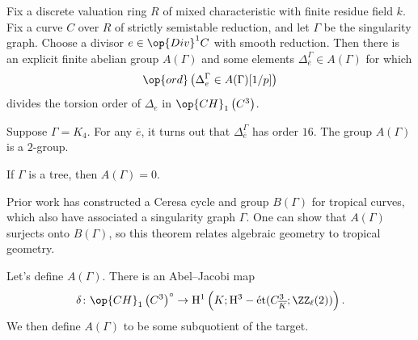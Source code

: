 \documentclass{article}
\begin{document}
\begin{theorem}
	Fix a discrete valuation ring $R$ of mixed characteristic with finite residue field $k$. Fix a curve $C$ over $R$ of strictly semistable reduction, and let $\Gamma$ be the singularity graph. Choose a divisor $e\in\op{Div}^1C$ with smooth reduction. Then there is an explicit finite abelian group $A(\Gamma)$ and some elements $\Delta_{\overline e}^\Gamma\in A(\Gamma)$ for which
	\[\op{ord}\left(\Delta_e^\Gamma\in A(\Gamma)[1/p]\right)\]
	divides the torsion order of $\Delta_e$ in $\op{CH}_1\left(C^3\right)$.
\end{theorem}
\begin{example}
	Suppose $\Gamma=K_4$. For any $\overline e$, it turns out that $\Delta_{\overline e}^\Gamma$ has order $16$. The group $A(\Gamma)$ is a $2$-group.
\end{example}
\begin{example}
	If $\Gamma$ is a tree, then $A(\Gamma)=0$.
\end{example}
\begin{remark}
	Prior work has constructed a Ceresa cycle and group $B(\Gamma)$ for tropical curves, which also have associated a singularity graph $\Gamma$. One can show that $A(\Gamma)$ surjects onto $B(\Gamma)$, so this theorem relates algebraic geometry to tropical geometry.
\end{remark}
Let's define $A(\Gamma)$. There is an Abel--Jacobi map
\[\delta\colon\op{CH}_1\left(C^3\right)^\circ\to\mathrm H^1\left(K;\mathrm H^3-{\mathrm{\acute et}}(C^3_{\overline K};\ZZ_\ell(2))\right).\]
We then define $A(\Gamma)$ to be some subquotient of the target.
\end{document}
